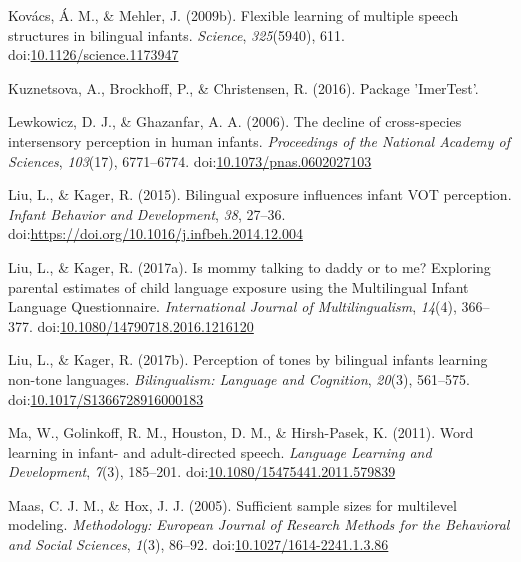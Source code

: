 \documentclass[,man,floatsintext]{apa6}
\begin{document}
\leavevmode\hypertarget{ref-kovacs_2009b}{}%
Kovács, Á. M., \& Mehler, J. (2009b). Flexible learning of multiple speech structures in bilingual infants. \emph{Science}, \emph{325}(5940), 611. doi:\href{https://doi.org/10.1126/science.1173947}{10.1126/science.1173947}

\leavevmode\hypertarget{ref-kuznetsova_2016}{}%
Kuznetsova, A., Brockhoff, P., \& Christensen, R. (2016). Package 'ImerTest'.

\leavevmode\hypertarget{ref-lewkowicz_2006}{}%
Lewkowicz, D. J., \& Ghazanfar, A. A. (2006). The decline of cross-species intersensory perception in human infants. \emph{Proceedings of the National Academy of Sciences}, \emph{103}(17), 6771--6774. doi:\href{https://doi.org/10.1073/pnas.0602027103}{10.1073/pnas.0602027103}

\leavevmode\hypertarget{ref-liu_2015}{}%
Liu, L., \& Kager, R. (2015). Bilingual exposure influences infant VOT perception. \emph{Infant Behavior and Development}, \emph{38}, 27--36. doi:\href{https://doi.org/https://doi.org/10.1016/j.infbeh.2014.12.004}{https://doi.org/10.1016/j.infbeh.2014.12.004}

\leavevmode\hypertarget{ref-liu_2017a}{}%
Liu, L., \& Kager, R. (2017a). Is mommy talking to daddy or to me? Exploring parental estimates of child language exposure using the Multilingual Infant Language Questionnaire. \emph{International Journal of Multilingualism}, \emph{14}(4), 366--377. doi:\href{https://doi.org/10.1080/14790718.2016.1216120}{10.1080/14790718.2016.1216120}

\leavevmode\hypertarget{ref-liu_2017b}{}%
Liu, L., \& Kager, R. (2017b). Perception of tones by bilingual infants learning non-tone languages. \emph{Bilingualism: Language and Cognition}, \emph{20}(3), 561--575. doi:\href{https://doi.org/10.1017/S1366728916000183}{10.1017/S1366728916000183}

\leavevmode\hypertarget{ref-ma_2011}{}%
Ma, W., Golinkoff, R. M., Houston, D. M., \& Hirsh-Pasek, K. (2011). Word learning in infant- and adult-directed speech. \emph{Language Learning and Development}, \emph{7}(3), 185--201. doi:\href{https://doi.org/10.1080/15475441.2011.579839}{10.1080/15475441.2011.579839}

\leavevmode\hypertarget{ref-maas_2005}{}%
Maas, C. J. M., \& Hox, J. J. (2005). Sufficient sample sizes for multilevel modeling. \emph{Methodology: European Journal of Research Methods for the Behavioral and Social Sciences}, \emph{1}(3), 86--92. doi:\href{https://doi.org/10.1027/1614-2241.1.3.86}{10.1027/1614-2241.1.3.86}
\end{document}
